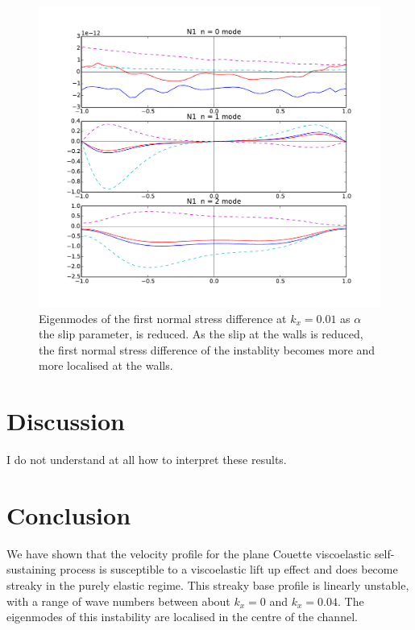 \documentclass{jfm}
\begin{document}
\begin{figure}
    \centering
    \includegraphics[width=\textwidth]{./figures/eigenmode_varslip}
    \caption{Eigenmodes of the first normal stress difference at $k_x=0.01$ as $\alpha$ the slip parameter, is reduced. As the slip at the walls is reduced, the first normal stress difference of the instablity becomes more and more localised at the walls.}
    \label{fig:eigenmode_varslip}
\end{figure}

\section{Discussion}

I do not understand at all how to interpret these results.

\section{Conclusion}

We have shown that the velocity profile for the plane Couette viscoelastic self-sustaining process is susceptible to a viscoelastic lift up effect and does become streaky in the purely elastic regime. This streaky base profile is linearly unstable, with a range of wave numbers between about $k_x = 0$ and $k_x = 0.04$. The eigenmodes of this instability are localised in the centre of the channel.





\end{document}

